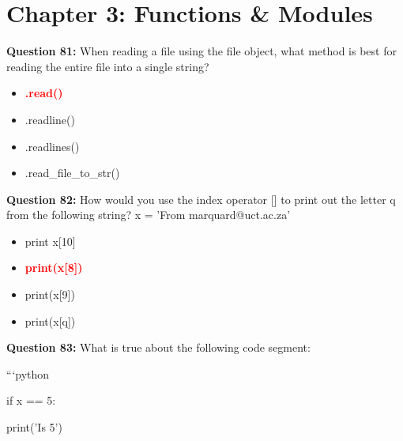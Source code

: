 \documentclass[12pt,a4paper]{article}
\begin{document}
\vspace{0.5cm}

\section{Chapter 3: Functions & Modules}

\textbf{Question 81:} When reading a file using the file object, what method is best for reading the entire file into a single string?

\begin{itemize}
    \item[\textbf{A.}] \textcolor{red}{\textbf{.read()}}
    \item[\textbf{B.}] .readline()
    \item[\textbf{C.}] .readlines()
    \item[\textbf{D.}] .read_file_to_str()
\end{itemize}

\vspace{0.5cm}

\textbf{Question 82:} How would you use the index operator [] to print out the letter q from the following string? x = 'From marquard@uct.ac.za'

\begin{itemize}
    \item[\textbf{A.}] print x[10]
    \item[\textbf{B.}] \textcolor{red}{\textbf{print(x[8])}}
    \item[\textbf{C.}] print(x[9])
    \item[\textbf{D.}] print(x[q])
\end{itemize}

\vspace{0.5cm}

\textbf{Question 83:} What is true about the following code segment:\newline

\newline
\newline

\newline
```python\newline

\newline
if x == 5:\newline

\newline
    print('Is 5')\newline
\end{document}

